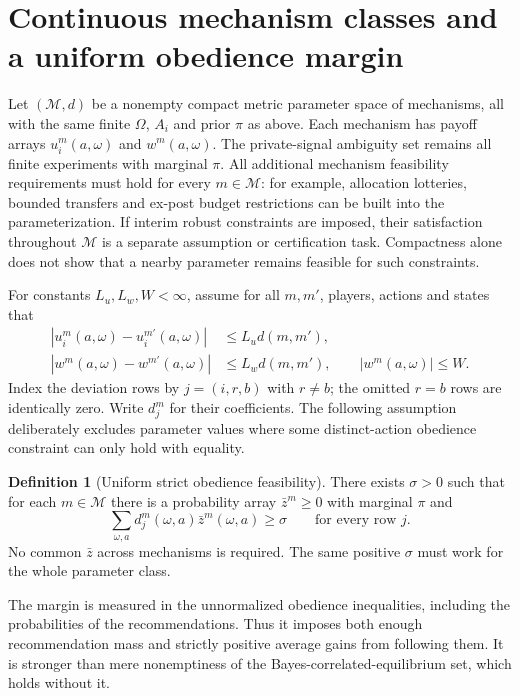 \documentclass[11pt]{article}
\theoremstyle{definition}
\newtheorem{definition}[theorem]{Definition}
\theoremstyle{remark}
\begin{document}
\section{Continuous mechanism classes and a uniform obedience margin}
Let $(\mathcal M,d)$ be a nonempty compact metric parameter space of
mechanisms, all with the same finite $\Omega$, $A_i$ and prior $\pi$ as
above. Each mechanism has payoff arrays $u_i^m(a,\omega)$ and
$w^m(a,\omega)$. The private-signal ambiguity set remains all finite
experiments with marginal $\pi$. All additional mechanism feasibility
requirements must hold for every $m\in\mathcal M$: for example,
allocation lotteries, bounded transfers and ex-post budget restrictions
can be built into the parameterization. If interim robust constraints
are imposed, their satisfaction throughout $\mathcal M$ is a separate
assumption or certification task. Compactness alone does not show that
a nearby parameter remains feasible for such constraints.

For constants $L_u,L_w,W<\infty$, assume for all $m,m'$, players,
actions and states that
\begin{align*}
 |u_i^m(a,\omega)-u_i^{m'}(a,\omega)|&\leq L_u d(m,m'),\\
 |w^m(a,\omega)-w^{m'}(a,\omega)|&\leq L_w d(m,m'),\qquad
 |w^m(a,\omega)|\leq W.
\end{align*}
Index the deviation rows by $j=(i,r,b)$ with $r\ne b$; the omitted
$r=b$ rows are identically zero. Write $d_j^m$ for their coefficients.
The following assumption deliberately excludes parameter values where
some distinct-action obedience constraint can only hold with equality.

\begin{definition}[Uniform strict obedience feasibility]
There exists $\sigma>0$ such that for each $m\in\mathcal M$ there is
a probability array $\bar z^m\geq0$ with marginal $\pi$ and
\[
 \sum_{\omega,a}d_j^m(\omega,a)\bar z^m(\omega,a)\geq\sigma
 \qquad\text{for every row }j.
\]
No common $\bar z$ across mechanisms is required. The same positive
$\sigma$ must work for the whole parameter class.
\end{definition}
The margin is measured in the unnormalized obedience inequalities,
including the probabilities of the recommendations. Thus it imposes
both enough recommendation mass and strictly positive average gains
from following them. It is stronger than mere nonemptiness of the
Bayes-correlated-equilibrium set, which holds without it.
\end{document}
